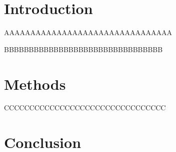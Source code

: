\documentclass{article}
\begin{document}
\section{Introduction}


\blindtext

AAAAAAAAAAAAAAAAAAAAAAAAAAAAAAAA

\blindtext[1]

BBBBBBBBBBBBBBBBBBBBBBBBBBBBBBBB

\blindtext[2]



\section{Methods}


\Blindtext[1][1]

CCCCCCCCCCCCCCCCCCCCCCCCCCCCCCCC

\Blindtext[2][1]



\section{Conclusion}

\Blindtext[2][2]
\end{document}
